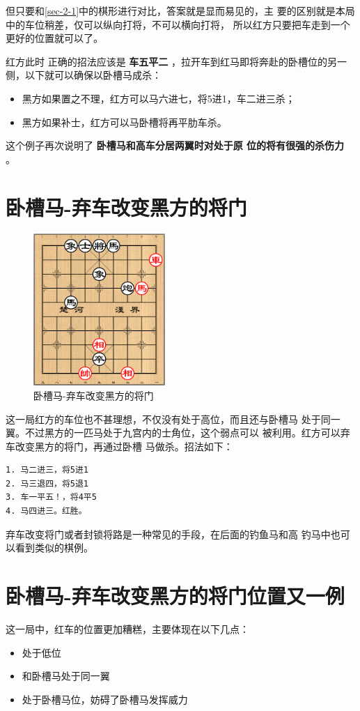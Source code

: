 \documentclass[a5paper,twoside]{book}
\begin{document}
但只要和\ref{sec-2-1}中的棋形进行对比，答案就是显而易见的，主
要的区别就是本局中的车位稍差，仅可以纵向打将，不可以横向打将，
所以红方只要把车走到一个更好的位置就可以了。

红方此时
正确的招法应该是 \textbf{车五平二} ，拉开车到红马即将奔赴的卧槽位的另一
侧，以下就可以确保以卧槽马成杀：
\begin{itemize}
\item 黑方如果置之不理，红方可以马六进七，将5进1，车二进三杀；
\item 黑方如果补士，红方可以马卧槽将再平肋车杀。
\end{itemize}

这个例子再次说明了 \textbf{卧槽马和高车分居两翼时对处于原
位的将有很强的杀伤力} 。

\section{卧槽马-弃车改变黑方的将门}
\label{sec-2-3}
\begin{figure}[H]
\centering
\includegraphics[width=5cm]{pic/卧槽马-弃车改变黑方的将门.png}
\caption{卧槽马-弃车改变黑方的将门}
\end{figure}

这一局红方的车位也不甚理想，不仅没有处于高位，而且还与卧槽马
处于同一翼。不过黑方的一匹马处于九宫内的士角位，这个弱点可以
被利用。红方可以弃车改变黑方的将门，再通过卧槽
马做杀。招法如下：

\begin{verbatim}
1. 马二进三，将5进1
2. 马三退四，将5退1
3. 车一平五！，将4平5
4. 马四进三。红胜。
\end{verbatim}

弃车改变将门或者封锁将路是一种常见的手段，在后面的钓鱼马和高
钓马中也可以看到类似的棋例。

\section{卧槽马-弃车改变黑方的将门位置又一例}
\label{sec-2-4}
这一局中，红车的位置更加糟糕，主要体现在以下几点：
\begin{itemize}
\item 处于低位
\item 和卧槽马处于同一翼
\item 处于卧槽马位，妨碍了卧槽马发挥威力
\end{itemize}
\end{document}
